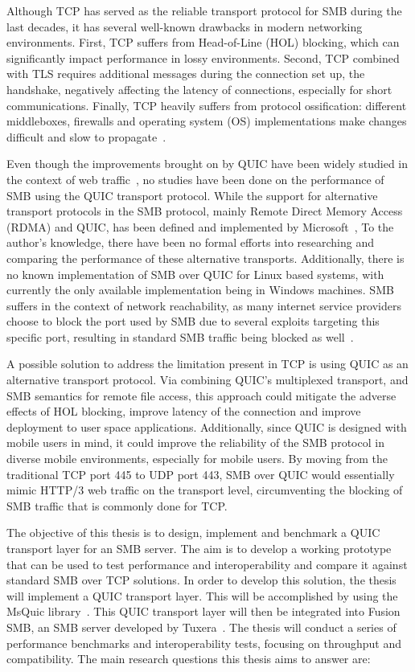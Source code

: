 \documentclass[english, 12pt, a4paper, elec, utf8, a-2b, online]{aaltothesis}
\begin{document}
Although TCP has served as the reliable transport protocol for SMB during the last
decades, it has several well-known drawbacks in modern networking environments.
First, TCP suffers from Head-of-Line (HOL) blocking, which can significantly
impact performance in lossy environments. Second, TCP combined with TLS requires
additional messages during the connection set up, the handshake, negatively affecting
the latency of connections, especially for short communications. Finally,
TCP heavily suffers from protocol ossification: different middleboxes, firewalls and
operating system (OS) implementations make changes difficult and slow to propagate~\cite{quic_transport_protocol_design}.

Even though the improvements brought on by QUIC have been widely studied in the context
of web traffic~\cite{quic_better_for_what,evaluating_quic_perf,quic_and_tcp_performance},
no studies have been done on the performance of SMB using the QUIC transport protocol.
While the support for alternative transport protocols in the SMB protocol, mainly
Remote Direct Memory Access (RDMA) and QUIC, has been defined and implemented by Microsoft~\cite{smb2},
To the author's knowledge, there have been no formal
efforts into researching and comparing the performance of these alternative transports.
Additionally, there is no known implementation of SMB over QUIC for Linux
based systems, with currently the only available implementation being in Windows machines.
SMB suffers in the context of network reachability, as many internet service providers
choose to block the port used by SMB due to several exploits targeting this specific port,
resulting in standard SMB traffic being blocked as well~\cite{bitag_port_blocking}.

A possible solution to address the limitation present in TCP is using
QUIC as an alternative transport protocol. Via combining QUIC's multiplexed transport,
and SMB semantics for remote file access, this approach could mitigate the adverse effects of
HOL blocking, improve latency of the connection and improve deployment to user space
applications. Additionally, since QUIC is designed with mobile users in mind, it could
improve the reliability of the SMB protocol in diverse mobile environments, especially
for mobile users. By moving from the traditional TCP port 445 to UDP port 443,
SMB over QUIC would essentially mimic HTTP/3 web traffic on the transport level,
circumventing the blocking of SMB traffic that is commonly done for TCP.

The objective of this thesis is to design, implement and benchmark a QUIC transport
layer for an SMB server. The aim is to develop a working prototype that can be used to
test performance and interoperability and compare it against standard SMB over TCP solutions.
In order to develop this solution, the thesis will implement a QUIC transport layer. This
will be accomplished by using the MsQuic library~\cite{msquic}. This QUIC transport layer
will then be integrated into Fusion SMB, an SMB server developed by Tuxera~\cite{fusion}.
The thesis will conduct a series of performance benchmarks and interoperability tests,
focusing on throughput and compatibility. The main research questions this thesis aims to answer are:
\end{document}
